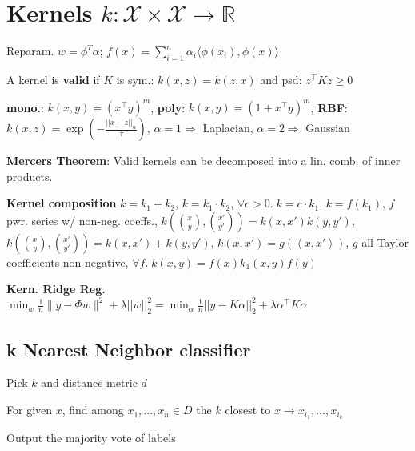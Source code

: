 \section*{Kernels $k: \mathcal{X} \times \mathcal{X} \rightarrow \mathbb{R}$}

Reparam. \(w = \phi^T\alpha\); \(f(x) = \sum_{i=1}^n\alpha_i\langle\phi(x_i), \phi(x)\rangle\)

A kernel is \textbf{valid} if $K$ is sym.: $k(x,z) = k(z,x)$ and psd: $z^\top K z \geq 0$

\textbf{mono.}: $k(x,y) = (x^\top y)^m$,
\textbf{poly}: $k(x,y) = (1+x^\top y)^m$,
\textbf{RBF}: $k(x, z) = \exp ( -\frac{||x - z||_\alpha}{\tau} )$, $\alpha = 1 \Rightarrow $ Laplacian, $\alpha = 2 \Rightarrow $ Gaussian

\textbf{Mercers Theorem}: Valid kernels can be decomposed into a lin. comb. of inner products.

\textbf{Kernel composition}
$k = k_1 + k_2$, 
$k = k_1 \cdot k_2$,
$\forall c > 0. \; k = c \cdot k_1$,
$k = f(k_1)$, $f$ pwr. series w/ non-neg. coeffs.,
$k(\binom{x}{y}, \binom{x'}{y'})=k(x,x')k(y,y')$, $k(\binom{x}{y}, \binom{x'}{y'})=k(x,x') + k(y,y')$,
$k(x, x') = g(\left< x, x' \right>)$, $g$ all Taylor coefficients non-negative,
$\forall f. \; k(x,y) = f(x)k_1(x,y)f(y)$

\textbf{Kern. Ridge Reg.}
$\min_w \frac1n \|y - \Phi w\|^2 + \lambda ||w||_2^2 = \min_\alpha \frac1n ||y - K\alpha||_2^2 + \lambda \alpha^\top K \alpha$


\subsection*{k Nearest Neighbor classifier}
\begin{rowlist}
	\item Pick $k$ and distance metric $d$
	\item For given $x$, find among $x_1,...,x_n \in D$ the $k$ closest to $x \to x_{i_1},..., x_{i_k}$
	\item Output the majority vote of labels
\end{rowlist}

